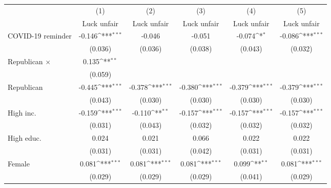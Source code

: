 {
\def\sym#1{\ifmmode^{#1}\else\(^{#1}\)\fi}
\begin{tabular}{l*{5}{c}}
\toprule
                    &\multicolumn{1}{c}{(1)}&\multicolumn{1}{c}{(2)}&\multicolumn{1}{c}{(3)}&\multicolumn{1}{c}{(4)}&\multicolumn{1}{c}{(5)}\\
                    &\multicolumn{1}{c}{Luck unfair}&\multicolumn{1}{c}{Luck unfair}&\multicolumn{1}{c}{Luck unfair}&\multicolumn{1}{c}{Luck unfair}&\multicolumn{1}{c}{Luck unfair}\\
\midrule
COVID-19 reminder   &      -0.146\sym{***}&      -0.046         &      -0.051         &      -0.074\sym{*}  &      -0.086\sym{***}\\
                    &     (0.036)         &     (0.036)         &     (0.038)         &     (0.043)         &     (0.032)         \\
\addlinespace
Republican $\times$ &       0.135\sym{**} &                     &                     &                     &                     \\
                    &     (0.059)         &                     &                     &                     &                     \\
\addlinespace
Republican          &      -0.445\sym{***}&      -0.378\sym{***}&      -0.380\sym{***}&      -0.379\sym{***}&      -0.379\sym{***}\\
                    &     (0.043)         &     (0.030)         &     (0.030)         &     (0.030)         &     (0.030)         \\
\addlinespace
High inc.           &      -0.159\sym{***}&      -0.110\sym{**} &      -0.157\sym{***}&      -0.157\sym{***}&      -0.157\sym{***}\\
                    &     (0.031)         &     (0.043)         &     (0.032)         &     (0.032)         &     (0.032)         \\
\addlinespace
High educ.          &       0.024         &       0.021         &       0.066         &       0.022         &       0.022         \\
                    &     (0.031)         &     (0.031)         &     (0.042)         &     (0.031)         &     (0.031)         \\
\addlinespace
Female              &       0.081\sym{***}&       0.081\sym{***}&       0.081\sym{***}&       0.099\sym{**} &       0.081\sym{***}\\
                    &     (0.029)         &     (0.029)         &     (0.029)         &     (0.041)         &     (0.029)         \\

\end{tabular}}
